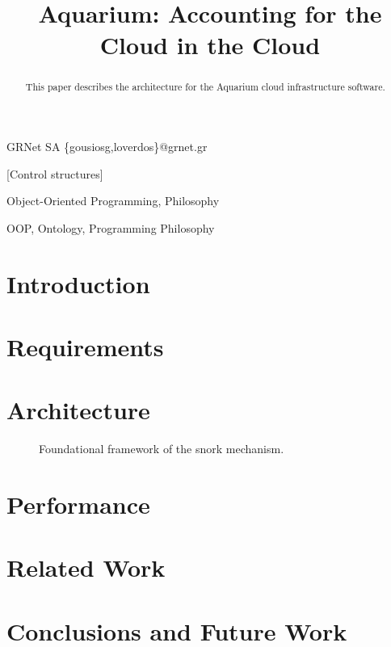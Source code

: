 \documentclass[preprint,10pt]{sigplanconf}
\begin{document}


\title{Aquarium: Accounting for the Cloud in the Cloud}

{GRNet SA}
{\{gousiosg,loverdos\}@grnet.gr}

\maketitle
\begin{abstract}
    This paper describes the architecture for the Aquarium cloud infrastructure
    software.
\end{abstract}

[Control structures]

\terms
    Object-Oriented Programming, Philosophy

\keywords
    OOP, Ontology, Programming Philosophy

\section{Introduction}
\section{Requirements}
\section{Architecture}

\begin{figure}
  \begin{center}
  
  \end{center}
  \caption{Foundational framework of the snork mechanism.}
  \label{fig-ffsm}
\end{figure}


\section{Performance}
\section{Related Work}
\section{Conclusions and Future Work}



\end{document}
